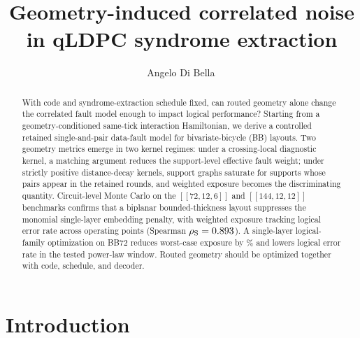 \documentclass[
aps,
prx,
10pt,
twocolumn,
groupedaddress,
longbibliography,
nofootinbib,
floatfix
]{revtex4-2}
\theoremstyle{definition}
\newcommand{\bb}[1]{\ensuremath{\left[\!\left[#1\right]\!\right]}}
\begin{document}
\title{Geometry-induced correlated noise in qLDPC syndrome extraction}

\author{Angelo Di Bella\,}

\begin{abstract}
With code and syndrome-extraction schedule fixed, can routed geometry alone change the correlated fault model enough to impact logical performance? Starting from a geometry-conditioned same-tick interaction Hamiltonian, we derive a controlled retained single-and-pair data-fault model for bivariate-bicycle (BB) layouts. Two geometry metrics emerge in two kernel regimes: under a crossing-local diagnostic kernel, a matching argument reduces the support-level effective fault weight; under strictly positive distance-decay kernels, support graphs saturate for supports whose pairs appear in the retained rounds, and weighted exposure becomes the discriminating quantity. Circuit-level Monte Carlo on the \bb{72,12,6} and \bb{144,12,12} benchmarks confirms that a biplanar bounded-thickness layout suppresses the monomial single-layer embedding penalty, with weighted exposure tracking logical error rate across \baselineCorrelationN{} operating points (Spearman $\rho_\mathrm{S}=0.893$). A single-layer logical-family optimization on BB72 reduces worst-case exposure by \bbSeventyTwoLAImprovementPct\% and lowers logical error rate in the tested power-law window. Routed geometry should be optimized together with code, schedule, and decoder.
\end{abstract}

\maketitle

\section{Introduction}
\label{sec:intro}
\end{document}
